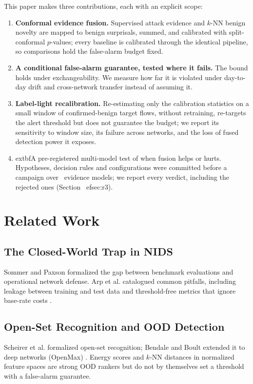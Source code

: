 \documentclass[conference]{IEEEtran}
\begin{document}
This paper makes three contributions, each with an explicit scope:
\begin{enumerate}
    \item \textbf{Conformal evidence fusion.} Supervised attack evidence and $k$-NN benign novelty are mapped to benign surprisals, summed, and calibrated with split-conformal $p$-values; every baseline is calibrated through the identical pipeline, so comparisons hold the false-alarm budget fixed.
    \item \textbf{A conditional false-alarm guarantee, tested where it fails.} The bound holds under exchangeability. We measure how far it is violated under day-to-day drift and cross-network transfer instead of assuming it.
    \item \textbf{Label-light recalibration.} Re-estimating only the calibration statistics on a small window of confirmed-benign target flows, without retraining, re-targets the alert threshold but does not guarantee the budget; we report its sensitivity to window size, its failure across networks, and the loss of fused detection power it exposes.
    \item 	extbf{A pre-registered multi-model test of when fusion helps or hurts.} Hypotheses, decision rules and configurations were committed before a campaign over \FactRThreeModels\ evidence models; we report every verdict, including the rejected ones (Section~
ef{sec:r3}).
\end{enumerate}

\section{Related Work}
\subsection{The Closed-World Trap in NIDS}
Sommer and Paxson \cite{sommer2010outside} formalized the gap between benchmark evaluations and operational network defense. Arp et al. \cite{arp2022dos} catalogued common pitfalls, including leakage between training and test data and threshold-free metrics that ignore base-rate costs \cite{axelsson2000base}.

\subsection{Open-Set Recognition and OOD Detection}
Scheirer et al. \cite{scheirer2012toward} formalized open-set recognition; Bendale and Boult extended it to deep networks (OpenMax) \cite{bendale2016towards}. Energy scores \cite{liu2020energy} and $k$-NN distances in normalized feature spaces \cite{sun2022out} are strong OOD rankers but do not by themselves set a threshold with a false-alarm guarantee.
\end{document}
